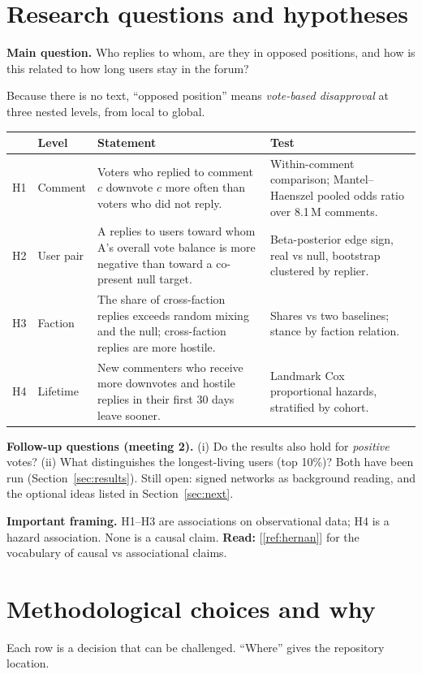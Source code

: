 \documentclass[11pt,a4paper]{article}
\newcommand{\readref}[1]{\textcolor{blue!50!black}{\textbf{Read:}} #1}
\begin{document}
\section{Research questions and hypotheses}\label{sec:hyp}
\textbf{Main question.} Who replies to whom, are they in opposed positions, and how is this related to how long users stay in the forum?

Because there is no text, ``opposed position'' means \emph{vote-based disapproval} at three nested levels, from local to global.

\begin{tabularx}{\textwidth}{@{}l l Y Y@{}}
\toprule
 & Level & Statement & Test \\
\midrule
H1 & Comment & Voters who replied to comment $c$ downvote $c$ more often than voters who did not reply. & Within-comment comparison; Mantel--Haenszel pooled odds ratio over 8.1\,M comments. \\
H2 & User pair & A replies to users toward whom A's overall vote balance is more negative than toward a co-present null target. & Beta-posterior edge sign, real vs null, bootstrap clustered by replier. \\
H3 & Faction & The share of cross-faction replies exceeds random mixing and the null; cross-faction replies are more hostile. & Shares vs two baselines; stance by faction relation. \\
H4 & Lifetime & New commenters who receive more downvotes and hostile replies in their first 30 days leave sooner. & Landmark Cox proportional hazards, stratified by cohort. \\
\bottomrule
\end{tabularx}

\textbf{Follow-up questions (meeting 2).} (i) Do the results also hold for \emph{positive} votes? (ii) What distinguishes the longest-living users (top 10\%)? Both have been run (Section~\ref{sec:results}). Still open: signed networks as background reading, and the optional ideas listed in Section~\ref{sec:next}.

\textbf{Important framing.} H1--H3 are associations on observational data; H4 is a hazard association. None is a causal claim. \readref{[\ref{ref:hernan}] for the vocabulary of causal vs associational claims.}

\section{Methodological choices and why}\label{sec:choices}
Each row is a decision that can be challenged. ``Where'' gives the repository location.
\end{document}
